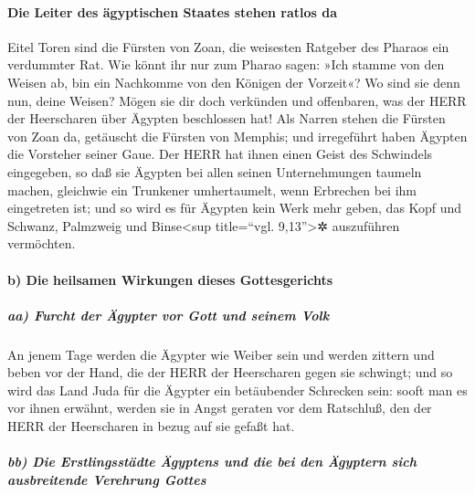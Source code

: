\hypertarget{die-leiter-des-uxe4gyptischen-staates-stehen-ratlos-da}{%
\paragraph{Die Leiter des ägyptischen Staates stehen ratlos
da}\label{die-leiter-des-uxe4gyptischen-staates-stehen-ratlos-da}}

Eitel Toren sind die Fürsten von Zoan, die weisesten
Ratgeber des Pharaos ein verdummter Rat. Wie könnt ihr nur zum Pharao
sagen: »Ich stamme von den Weisen ab, bin ein Nachkomme von den Königen
der Vorzeit«? Wo sind sie denn nun, deine Weisen? Mögen
sie dir doch verkünden und offenbaren, was der HERR der Heerscharen über
Ägypten beschlossen hat! Als Narren stehen die Fürsten
von Zoan da, getäuscht die Fürsten von Memphis; und irregeführt haben
Ägypten die Vorsteher seiner Gaue. Der HERR hat ihnen
einen Geist des Schwindels eingegeben, so daß sie Ägypten bei allen
seinen Unternehmungen taumeln machen, gleichwie ein Trunkener
umhertaumelt, wenn Erbrechen bei ihm eingetreten ist; und
so wird es für Ägypten kein Werk mehr geben, das Kopf und Schwanz,
Palmzweig und Binse\textless sup title=``vgl. 9,13''\textgreater✲
auszuführen vermöchten.

\hypertarget{b-die-heilsamen-wirkungen-dieses-gottesgerichts}{%
\paragraph{b) Die heilsamen Wirkungen dieses
Gottesgerichts}\label{b-die-heilsamen-wirkungen-dieses-gottesgerichts}}

\hypertarget{aa-furcht-der-uxe4gypter-vor-gott-und-seinem-volk}{%
\subparagraph{aa) Furcht der Ägypter vor Gott und seinem
Volk}\label{aa-furcht-der-uxe4gypter-vor-gott-und-seinem-volk}}

An jenem Tage werden die Ägypter wie Weiber sein und
werden zittern und beben vor der Hand, die der HERR der Heerscharen
gegen sie schwingt; und so wird das Land Juda für die
Ägypter ein betäubender Schrecken sein: sooft man es vor ihnen erwähnt,
werden sie in Angst geraten vor dem Ratschluß, den der HERR der
Heerscharen in bezug auf sie gefaßt hat.

\hypertarget{bb-die-erstlingsstuxe4dte-uxe4gyptens-und-die-bei-den-uxe4gyptern-sich-ausbreitende-verehrung-gottes}{%
\subparagraph{bb) Die Erstlingsstädte Ägyptens und die bei den Ägyptern
sich ausbreitende Verehrung
Gottes}\label{bb-die-erstlingsstuxe4dte-uxe4gyptens-und-die-bei-den-uxe4gyptern-sich-ausbreitende-verehrung-gottes}}


